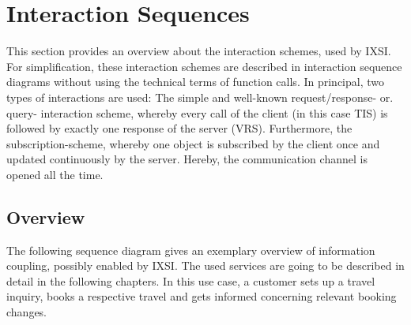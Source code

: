 \chapter{Interaction Sequences}
\label{cha:Interaktionsprotokolle}
This section provides an overview about the interaction schemes, used by IXSI. For simplification, these interaction schemes are described in interaction sequence diagrams without using the technical terms of function calls. In principal, two types of interactions are used: The simple and well-known request/response- or. query- interaction scheme, whereby every call of the client (in this case TIS) is followed by exactly one response of the server (VRS). Furthermore, the subscription-scheme, whereby one object is subscribed by the client once and updated continuously by the server. Hereby, the communication channel is opened all the time. 

\section{Overview}
The following sequence diagram gives an exemplary overview of information coupling, possibly enabled by IXSI. The used services are going to be described in detail in the following chapters. In this use case, a customer sets up a travel inquiry, books a respective travel and gets informed concerning relevant booking changes. 


